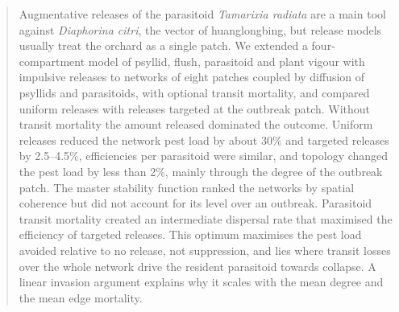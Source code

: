 \begin{abstract}
Augmentative releases of the parasitoid \textit{Tamarixia radiata} are a main tool against \textit{Diaphorina citri}, the vector of huanglongbing, but release models usually treat the orchard as a single patch. We extended a four-compartment model of psyllid, flush, parasitoid and plant vigour with impulsive releases to networks of eight patches coupled by diffusion of psyllids and parasitoids, with optional transit mortality, and compared uniform releases with releases targeted at the outbreak patch. Without transit mortality the amount released dominated the outcome. Uniform releases reduced the network pest load by about 30\% and targeted releases by 2.5--4.5\%, efficiencies per parasitoid were similar, and topology changed the pest load by less than 2\%, mainly through the degree of the outbreak patch. The master stability function ranked the networks by spatial coherence but did not account for its level over an outbreak. Parasitoid transit mortality created an intermediate dispersal rate that maximised the efficiency of targeted releases. This optimum maximises the pest load avoided relative to no release, not suppression, and lies where transit losses over the whole network drive the resident parasitoid towards collapse. A linear invasion argument explains why it scales with the mean degree and the mean edge mortality.
\end{abstract}
